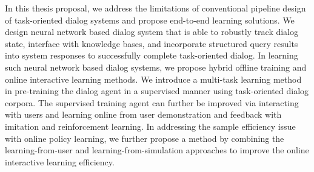 In this thesis proposal, we address the limitations of conventional pipeline design of task-oriented dialog systems and propose end-to-end learning solutions. We design neural network based dialog system that is able to robustly track dialog state, interface with knowledge bases, and incorporate structured query results into system responses to successfully complete task-oriented dialog. In learning such neural network based dialog systems, we propose hybrid offline training and online interactive learning methods. We introduce a multi-task learning method in pre-training the dialog agent in a supervised manner using task-oriented dialog corpora. The supervised training agent can further be improved via interacting with users and learning online from user demonstration and feedback with imitation and reinforcement learning. In addressing the sample efficiency issue with online policy learning, we further propose a method by combining the learning-from-user and learning-from-simulation approaches to improve the online interactive learning efficiency.
